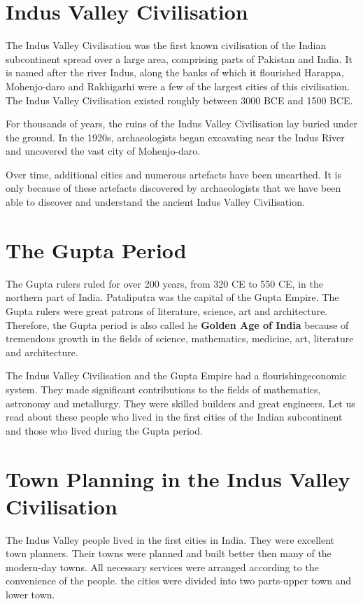 \section{Indus Valley Civilisation}
The Indus Valley Civilisation was the first known civilisation of the Indian subcontinent spread over a large area, comprising parts of Pakistan and India. It is named after the river Indus, along the banks of which it flourished Harappa, Mohenjo-daro and Rakhigarhi were a few of the largest cities of this civilisation. The Indus Valley Civilisation existed roughly between 3000 BCE and 1500 BCE.
\vspace{0.5in}
\par
For thousands of years, the ruins of the Indus Valley Civilisation lay buried under the ground. In the 1920s, archaeologists began excavating near the Indus River and uncovered the vast city of Mohenjo-daro.
\vspace{0.1in}
\par
Over time, additional cities and numerous artefacts have been unearthed. It is only because of these artefacts discovered by archaeologists that we have been able to discover and understand the ancient Indus Valley Civilisation.
\vspace{2.2in}
\section{The Gupta Period}
The Gupta rulers ruled for over 200 years, from 320 CE to 550 CE, in the northern part of India.
\vspace{0.5in}
Pataliputra was the capital of the Gupta Empire. The Gupta rulers were great patrons of literature, science, art and architecture. Therefore, the Gupta period is also called he \textbf{Golden Age of India} because of tremendous growth in the fields of science, mathematics, medicine, art, literature and architecture.
\vspace{0.1in}
\par
The Indus Valley Civilisation and the Gupta Empire had a flourishingeconomic system. They made significant contributions to the fields of mathematics, astronomy and metallurgy. They were skilled builders and great engineers. Let us read about these people who lived in the first cities of the Indian subcontinent and those who lived during the Gupta period.
\section{Town Planning in the Indus Valley Civilisation}
The Indus Valley people lived in the first cities in India. They were excellent town planners. Their towns were planned and built better then many of the modern-day towns. All necessary services were arranged according to the convenience of the people. the cities were divided into two parts-upper town and lower town.
